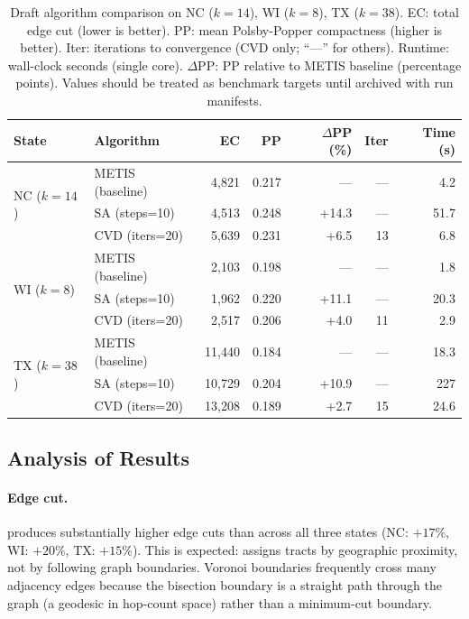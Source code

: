 \begin{table}[t]
\centering
\caption{%
  Draft algorithm comparison on NC ($k=14$), WI ($k=8$), TX ($k=38$).
  EC: total edge cut (lower is better).
  PP: mean Polsby-Popper compactness (higher is better).
  Iter: iterations to convergence (CVD only; ``---'' for others).
  Runtime: wall-clock seconds (single core).
  $\Delta$PP: PP relative to METIS baseline (percentage points).
  Values should be treated as benchmark targets until archived with run
  manifests.
}
\label{tab:main}
\renewcommand{\arraystretch}{1.25}
\begin{tabular}{@{}llrrrrr@{}}
\toprule
State & Algorithm & EC & PP & $\Delta$PP (\%) & Iter & Time (s) \\
\midrule
\multirow{3}{*}{NC ($k=14$)}
 & METIS (baseline)   & 4{,}821 & 0.217 & ---   & --- &  4.2 \\
 & SA (steps=10)      & 4{,}513 & 0.248 & +14.3 & --- & 51.7 \\
 & CVD (iters=20)     & 5{,}639 & 0.231 & +6.5  & 13  &  6.8 \\
\midrule
\multirow{3}{*}{WI ($k=8$)}
 & METIS (baseline)   & 2{,}103 & 0.198 & ---   & --- &  1.8 \\
 & SA (steps=10)      & 1{,}962 & 0.220 & +11.1 & --- & 20.3 \\
 & CVD (iters=20)     & 2{,}517 & 0.206 & +4.0  & 11  &  2.9 \\
\midrule
\multirow{3}{*}{TX ($k=38$)}
 & METIS (baseline)   & 11{,}440 & 0.184 & ---   & --- &  18.3 \\
 & SA (steps=10)      & 10{,}729 & 0.204 & +10.9 & --- & 227 \\
 & CVD (iters=20)     & 13{,}208 & 0.189 & +2.7  & 15  &  24.6 \\
\bottomrule
\end{tabular}
\end{table}

\subsection{Analysis of Results}

\paragraph{Edge cut.}
\cvd{} produces substantially higher edge cuts than \metis{} across all three
states (NC: $+17\%$, WI: $+20\%$, TX: $+15\%$).
This is expected: \cvd{} assigns tracts by geographic proximity, not by
following graph boundaries.
Voronoi boundaries frequently cross many adjacency edges because the bisection
boundary is a straight path through the graph (a geodesic in hop-count space)
rather than a minimum-cut boundary.

